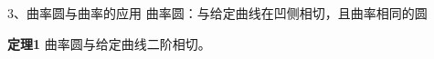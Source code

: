 \begin{frame}{3、曲率圆与曲率的应用}
	\linespread{1.2} \pause 
	{\bb 曲率圆：}与给定曲线在凹侧相切，且曲率相同的圆
	
	\pause\vspace{1ex}
	\begin{center}
	\end{center}
	\vspace{-1em}\pause 
	\begin{block}{\bf 定理1}
		曲率圆与给定曲线二阶相切。
	\end{block}
\end{frame}

